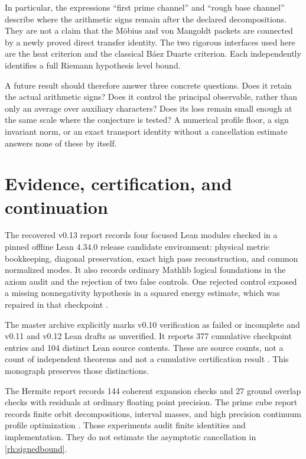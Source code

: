 In particular, the expressions ``first prime channel'' and ``rough base channel'' describe where the arithmetic signs remain after the declared decompositions. They are not a claim that the Möbius and von Mangoldt packets are connected by a newly proved direct transfer identity. The two rigorous interfaces used here are the heat criterion and the classical Báez Duarte criterion. Each independently identifies a full Riemann hypothesis level bound.

A future result should therefore answer three concrete questions. Does it retain the actual arithmetic signs? Does it control the principal observable, rather than only an average over auxiliary characters? Does its loss remain small enough at the same scale where the conjecture is tested? A numerical profile floor, a sign invariant norm, or an exact transport identity without a cancellation estimate answers none of these by itself.

\section{Evidence, certification, and continuation}

The recovered v0.13 report records four focused Lean modules checked in a pinned offline Lean \(4.34.0\) release candidate environment: physical metric bookkeeping, diagonal preservation, exact high pass reconstruction, and common normalized modes. It also records ordinary Mathlib logical foundations in the axiom audit and the rejection of two false controls. One rejected control exposed a missing nonnegativity hypothesis in a squared energy estimate, which was repaired in that checkpoint \cite{KomorebiFinalGap}.

The master archive explicitly marks v0.10 verification as failed or incomplete and v0.11 and v0.12 Lean drafts as unverified. It reports 377 cumulative checkpoint entries and 104 distinct Lean source contents. These are source counts, not a count of independent theorems and not a cumulative certification result \cite{KomorebiMaster}. This monograph preserves those distinctions.

The Hermite report records 144 coherent expansion checks and 27 ground overlap checks with residuals at ordinary floating point precision. The prime cube report records finite orbit decompositions, interval masses, and high precision continuum profile optimization \cite{KomorebiHermite,KomorebiParity}. Those experiments audit finite identities and implementation. They do not estimate the asymptotic cancellation in \eqref{rh:signedbound}.

